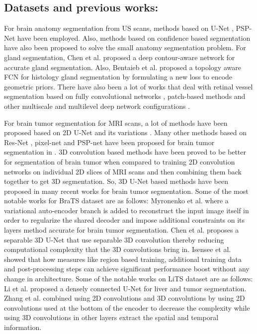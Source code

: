 \documentclass[journal,twoside,web]{ieeecolor}
\begin{document}
\subsection{Datasets and previous works:}
For brain anatomy segmentation from US scans, methods based on U-Net \cite{martin2018automatic}, PSP-Net \cite{wang2018automatic} have been employed. Also, methods based on confidence based segmentation \cite{valanarasu2020learning} have also been proposed to solve the small anatomy segmentation problem. For gland segmentation, Chen et al. \cite{chen2017dcan} proposed a deep contour-aware network for accurate gland segmentation. Also, Bentaieb et al. \cite{bentaieb2016topology} proposed a topology aware FCN for histology gland segmentation by formulating a new loss to encode geometric priors. There have also been a lot of works that deal with retinal vessel segmentation based on fully convolutional networks \cite{jiang2019automatic}, patch-based methods \cite{feng2017patch} and other multiscale and multilevel deep network configurations \cite{samuel2019multilevel}.     

For brain tumor segmentation for MRI scans,  a lot of methods have been proposed based on 2D U-Net and its variations \cite{weng2019automatic,fang2018three,fridman2018brain,kermi2018deep}.  Many other methods based on Res-Net \cite{he2016deep}, pixel-net \cite{bansal2017pixelnet} and PSP-net \cite{zhao2017pyramid} have been proposed for brain tumor segmentation in \cite{islam2018glioma}. 3D convolution based methods have been proved to be better for segmentation of brain tumor when compared to training 2D convolution networks on individual 2D slices of MRI scans and then  combining them back together to get 3D segmentation. So, 3D U-Net based methods have been proposed in many recent works for brain tumor segmentation. Some of the most notable works for BraTS dataset are as follows: Myronenko et al. \cite{myronenko20183d} where a variational auto-encoder branch is added to reconstruct the input image itself in order to regularize the shared decoder and impose additional constraints on its layers method accurate for brain tumor segmentation. Chen et al. \cite{chen2018s3d} proposes a separable 3D U-Net that use separable 3D convolution thereby reducing computational complexity that the 3D convolutions bring in. Isensee et al. \cite{isensee2018no} showed that how measures like region based training, additional training data and post-processing steps can achieve significant performance boost without any change in architecture. Some of the notable works on LiTS dataset are as follows: Li et al. \cite{li2018h} proposed a densely connected U-Net for liver and tumor segmentation. Zhang et al. \cite{zhang2019light} combined using 2D convolutions and 3D convolutions by using 2D convolutions used at the bottom of the
encoder to decrease the complexity while using  3D convolutions in other layers extract the spatial and temporal information.  
\end{document}

